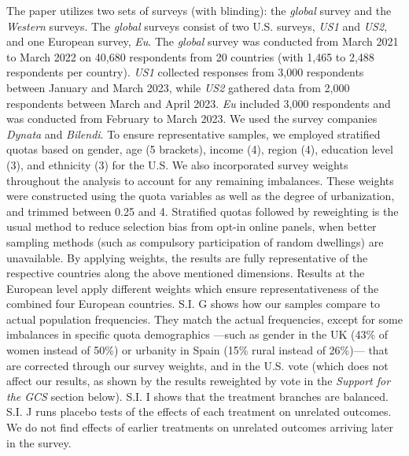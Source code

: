 \begin{small}
The paper utilizes two sets of surveys (with blinding): the \textit{global} survey and the \textit{Western} surveys. The \textit{global} surveys consist of two U.S. surveys, \textit{US1} and \textit{US2}, and one European survey, \textit{Eu}. The \textit{global} survey was conducted from March 2021 to March 2022 on 40,680 respondents from 20 countries (with 1,465 to 2,488 respondents per country). \textit{US1} collected responses from 3,000 respondents between January and March 2023, while \textit{US2} gathered data from 2,000 respondents between March and April 2023. \textit{Eu} included 3,000 respondents and was conducted from February to March 2023. We used the survey companies \emph{Dynata} and \emph{Bilendi}. To ensure representative samples, we employed stratified quotas based on gender, age (5 brackets), income (4), region (4), education level (3), and ethnicity (3) for the U.S. We also incorporated survey weights throughout the analysis to account for any remaining imbalances. These weights were constructed using the quota variables as well as the degree of urbanization, and trimmed between 0.25 and 4. Stratified quotas followed by reweighting is the usual method to reduce selection bias from opt-in online panels, when better sampling methods (such as compulsory participation of random dwellings) are unavailable.\cite{scherpenzeel_how_2010} By applying weights, the results are fully representative of the respective countries along the above mentioned dimensions. %
Results at the European level apply different weights which ensure  representativeness of the combined four European countries. 
S.I. G 
shows how our samples compare to actual population frequencies. They match the actual frequencies, except for some imbalances in specific quota demographics ---such as gender in the UK (43\% of women instead of 50\%) or urbanity in Spain (15\% rural instead of 26\%)--- that are corrected through our survey weights, and in the U.S. vote (which does not affect our results, as shown by the results reweighted by vote in the \textit{Support for the GCS} section below). 
S.I. I 
shows that the treatment branches are balanced. 
S.I. J 
runs placebo tests of the effects of each treatment on unrelated outcomes. We do not find effects of earlier treatments on unrelated outcomes arriving later in the survey. 



\end{small}
